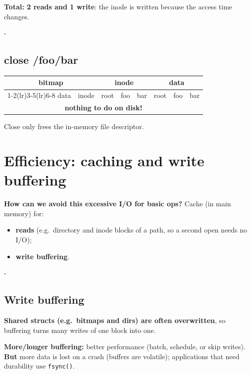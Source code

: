\documentclass[11pt,a4paper]{article}
\makeatletter
\newcommand{\keepspace}[1]{\par\penalty-100\begingroup
  \setlength{\dimen@}{#1}\dimen@ii\pagegoal\advance\dimen@ii-\pagetotal
  \ifdim\dimen@>\dimen@ii\ifdim\dimen@ii>\z@\vfil\fi\break\fi\endgroup}
\makeatother
\begin{document}
\noindent\textbf{Total: 2 reads and 1 write}: the inode is written because the
access time changes.

\keepspace{8\baselineskip}
\subsection{close /foo/bar}

\begin{center}
\small
\setlength{\tabcolsep}{3.5pt}
\renewcommand{\arraystretch}{1.18}
\begin{tabular}{@{}*{8}{c}@{}}
  \toprule
  \multicolumn{2}{c}{\textbf{bitmap}} & \multicolumn{3}{c}{\textbf{inode}} & \multicolumn{3}{c}{\textbf{data}} \\
  \cmidrule(lr){1-2}\cmidrule(lr){3-5}\cmidrule(lr){6-8}
  data & inode & root & foo & bar & root & foo & bar \\
  \midrule
  \multicolumn{8}{c}{\textbf{nothing to do on disk!}} \\
  \bottomrule
\end{tabular}
\end{center}

Close only frees the in-memory file descriptor.

\section{Efficiency: caching and write buffering}

\textbf{How can we avoid this excessive I/O for basic ops?} Cache (in main
memory) for:
\begin{itemize}
  \item \textbf{reads} (e.g.\ directory and inode blocks of a path, so a second
        open needs no I/O);
  \item \textbf{write buffering}.
\end{itemize}

\keepspace{8\baselineskip}
\subsection{Write buffering}

\textbf{Shared structs (e.g.\ bitmaps and dirs) are often overwritten}, so
buffering turns many writes of one block into one.

\begin{quizbox}
\textbf{More/longer buffering:} better performance (batch, schedule, or
skip writes). \textbf{But} more data is lost on a crash (buffers are
volatile); applications that need durability use \texttt{fsync()}.
\end{quizbox}
\end{document}
